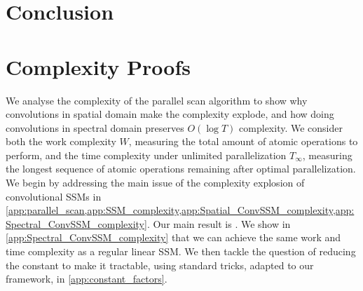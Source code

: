 \documentclass{article}
\begin{document}
\section{Conclusion}


\newpage
\appendix
\section{Complexity Proofs}
\label{app:complexity_proofs}
We analyse the complexity of the parallel scan algorithm to show why convolutions in spatial domain make the complexity explode, and how doing convolutions in spectral domain preserves $O(\log T)$ complexity. We consider both the work complexity $W$, measuring the total amount of atomic operations to perform, and the time complexity under unlimited parallelization $T_\infty$, measuring the longest sequence of atomic operations remaining after optimal parallelization.
We begin by addressing the main issue of the complexity explosion of convolutional SSMs in \cref{app:parallel_scan,app:SSM_complexity,app:Spatial_ConvSSM_complexity,app:Spectral_ConvSSM_complexity}. Our main result is . We show in \cref{app:Spectral_ConvSSM_complexity} that we can achieve the same work and time complexity as a regular linear SSM. We then tackle the question of reducing the constant to make it tractable, using standard tricks, adapted to our framework, in \cref{app:constant_factors}.
\end{document}
